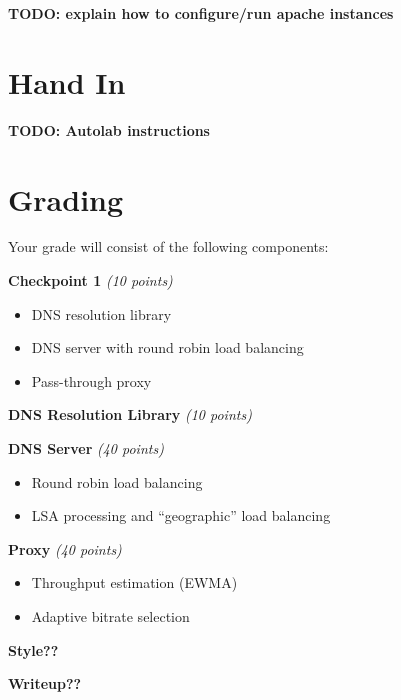 \documentclass{article}
\begin{document}
\textbf{TODO: explain how to configure/run apache instances}




\section{Hand In}

\textbf{TODO: Autolab instructions}


\section{Grading}

Your grade will consist of the following components:

\smallskip \noindent \textbf{Checkpoint 1} \textit{(10 points)}
\begin{itemize}
	\item DNS resolution library
	\item DNS server with round robin load balancing
	\item Pass-through proxy
\end{itemize}

\smallskip \noindent \textbf{DNS Resolution Library} \textit{(10 points)}

\smallskip \noindent \textbf{DNS Server} \textit{(40 points)}
\begin{itemize}
	\item Round robin load balancing
	\item LSA processing and ``geographic'' load balancing
\end{itemize}

\smallskip \noindent \textbf{Proxy} \textit{(40 points)}
\begin{itemize}
	\item Throughput estimation (EWMA)
	\item Adaptive bitrate selection
\end{itemize}

\smallskip \noindent \textbf{Style??}

\smallskip \noindent \textbf{Writeup??}
\end{document}
